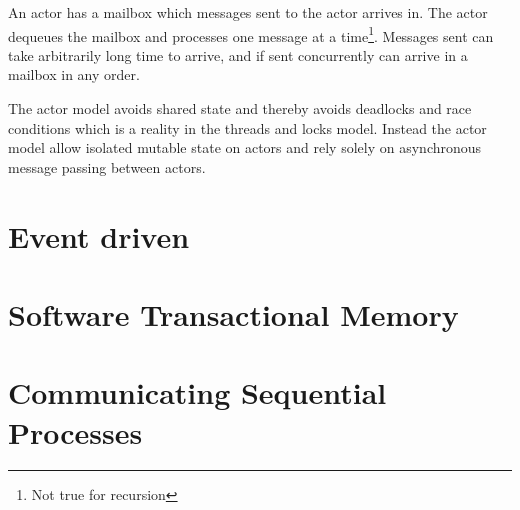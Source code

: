 An actor has a mailbox which messages sent to the actor arrives in. The actor dequeues the mailbox and processes one message at a time\footnote{Not true for recursion}. Messages sent can take arbitrarily long time to arrive, and if sent concurrently can arrive in a mailbox in any order\cite{hewitt2014actor}.

The actor model avoids shared state and thereby avoids deadlocks and race conditions which is a reality in the threads and locks model\citep[Chap. 32]{odersky2011programming}. Instead the actor model allow isolated mutable state on actors and rely solely on asynchronous message passing between actors.
\section{Event driven}
\section{Software Transactional Memory}
\section{Communicating Sequential Processes}

\worksheetend
